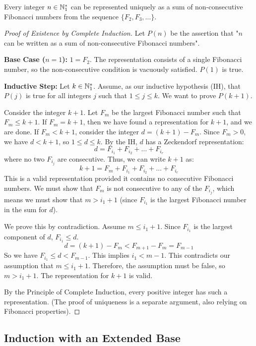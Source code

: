 \begin{theorem}
Every integer $n \in \mathbb{N}_{1}^*$ can be represented uniquely as a sum of non-consecutive Fibonacci numbers from the sequence $\{F_2, F_3, \dots\}$.
\end{theorem}
\begin{proof}[Proof of Existence by Complete Induction]
Let $P(n)$ be the assertion that "$n$ can be written as a sum of non-consecutive Fibonacci numbers".

\textbf{Base Case ($n=1$):} $1 = F_2$. The representation consists of a single Fibonacci number, so the non-consecutive condition is vacuously satisfied. $P(1)$ is true.

\textbf{Inductive Step:}
Let $k \in \mathbb{N}_{1}^*$. Assume, as our inductive hypothesis (IH), that $P(j)$ is true for all integers $j$ such that $1 \le j \le k$. We want to prove $P(k+1)$.

Consider the integer $k+1$. Let $F_m$ be the largest Fibonacci number such that $F_m \le k+1$.
If $F_m = k+1$, then we have found a representation for $k+1$, and we are done.
If $F_m < k+1$, consider the integer $d = (k+1) - F_m$. Since $F_m > 0$, we have $d < k+1$, so $1 \le d \le k$. By the IH, $d$ has a Zeckendorf representation:
$$ d = F_{i_1} + F_{i_2} + \dots + F_{i_r} $$
where no two $F_{i_j}$ are consecutive. Thus, we can write $k+1$ as:
$$ k+1 = F_m + F_{i_1} + F_{i_2} + \dots + F_{i_r} $$
This is a valid representation provided it contains no consecutive Fibonacci numbers. We must show that $F_m$ is not consecutive to any of the $F_{i_j}$, which means we must show that $m > i_1+1$ (since $F_{i_1}$ is the largest Fibonacci number in the sum for $d$).

We prove this by contradiction. Assume $m \le i_1+1$. Since $F_{i_1}$ is the largest component of $d$, $F_{i_1} \le d$.
$$ d = (k+1) - F_m < F_{m+1} - F_m = F_{m-1} $$
So we have $F_{i_1} \le d < F_{m-1}$. This implies $i_1 < m-1$. This contradicts our assumption that $m \le i_1+1$. Therefore, the assumption must be false, so $m > i_1+1$. The representation for $k+1$ is valid.

By the Principle of Complete Induction, every positive integer has such a representation. (The proof of uniqueness is a separate argument, also relying on Fibonacci properties).
\end{proof}

\subsection{Induction with an Extended Base}

